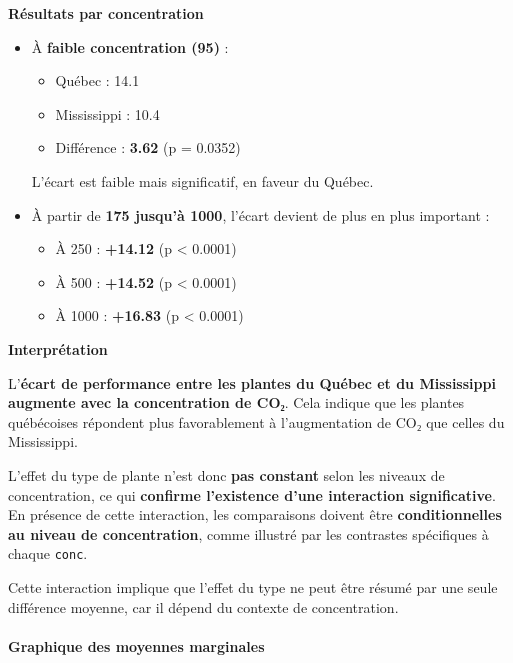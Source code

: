 \documentclass[
]{article}
\providecommand{\tightlist}{%
  \setlength{\itemsep}{0pt}\setlength{\parskip}{0pt}}
\begin{document}
\textbf{Résultats par concentration}

\begin{itemize}
\item
  À \textbf{faible concentration (95)} :

  \begin{itemize}
  \tightlist
  \item
    Québec : 14.1
  \item
    Mississippi : 10.4
  \item
    Différence : \textbf{3.62} (p = 0.0352)
  \end{itemize}

  L'écart est faible mais significatif, en faveur du Québec.
\item
  À partir de \textbf{175 jusqu'à 1000}, l'écart devient de plus en plus
  important :

  \begin{itemize}
  \tightlist
  \item
    À 250 : \textbf{+14.12} (p \textless{} 0.0001)
  \item
    À 500 : \textbf{+14.52} (p \textless{} 0.0001)
  \item
    À 1000 : \textbf{+16.83} (p \textless{} 0.0001)
  \end{itemize}
\end{itemize}

\textbf{Interprétation}

L'\textbf{écart de performance entre les plantes du Québec et du
Mississippi augmente avec la concentration de CO₂}. Cela indique que les
plantes québécoises répondent plus favorablement à l'augmentation de CO₂
que celles du Mississippi.

L'effet du type de plante n'est donc \textbf{pas constant} selon les
niveaux de concentration, ce qui \textbf{confirme l'existence d'une
interaction significative}. En présence de cette interaction, les
comparaisons doivent être \textbf{conditionnelles au niveau de
concentration}, comme illustré par les contrastes spécifiques à chaque
\texttt{conc}.

Cette interaction implique que l'effet du type ne peut être résumé par
une seule différence moyenne, car il dépend du contexte de
concentration.

\paragraph{Graphique des moyennes
marginales}\label{graphique-des-moyennes-marginales}
\end{document}
